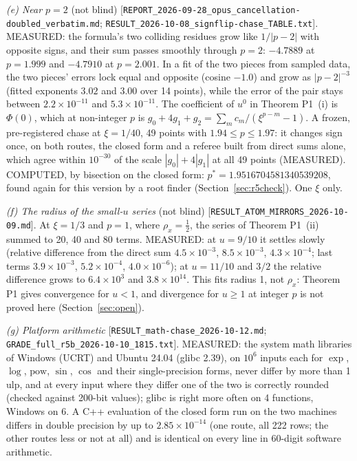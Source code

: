 \documentclass[11pt]{article}
\newcommand{\rec}[1]{\nolinkurl{#1}}
\begin{document}
\medskip
\noindent\emph{(e) Near $p=2$} (not blind) [\rec{REPORT_2026-09-28_opus_cancellation-doubled_verbatim.md}; \rec{RESULT_2026-10-08_signflip-chase_TABLE.txt}]. MEASURED: the formula's two colliding residues grow like $1/|p-2|$ with opposite signs, and their sum passes smoothly through $p=2$: $-4.7889$ at $p=1.999$ and $-4.7910$ at $p=2.001$. In a fit of the two pieces from sampled data, the two pieces' errors lock equal and opposite (cosine $-1.0$) and grow as $|p-2|^{-3}$ (fitted exponents $3.02$ and $3.00$ over 14 points), while the error of the pair stays between $2.2\times10^{-11}$ and $5.3\times10^{-11}$. The coefficient of $u^0$ in Theorem P1~(i) is $\Phi(0)$, which at non-integer $p$ is $g_0+4g_1+g_2=\sum_mc_m/(\xi^{p-m}-1)$. A frozen, pre-registered chase at $\xi=1/40$, 49 points with $1.94\le p\le1.97$: it changes sign once, on both routes, the closed form and a referee built from direct sums alone, which agree within $10^{-30}$ of the scale $|g_0|+4|g_1|$ at all 49 points (MEASURED). COMPUTED, by bisection on the closed form: $p^*=1.9516704581340539208$, found again for this version by a root finder (Section~\ref{sec:r5check}). One $\xi$ only.

\medskip
\noindent\emph{(f) The radius of the small-$u$ series} (not blind) [\rec{RESULT_ATOM_MIRRORS_2026-10-09.md}]. At $\xi=1/3$ and $p=1$, where $\rho_x=\frac12$, the series of Theorem P1~(ii) summed to 20, 40 and 80 terms. MEASURED: at $u=9/10$ it settles slowly (relative difference from the direct sum $4.5\times10^{-3}$, $8.5\times10^{-3}$, $4.3\times10^{-4}$; last terms $3.9\times10^{-3}$, $5.2\times10^{-4}$, $4.0\times10^{-6}$); at $u=11/10$ and $3/2$ the relative difference grows to $6.4\times10^3$ and $3.8\times10^{14}$. This fits radius 1, not $\rho_x$: Theorem P1 gives convergence for $u<1$, and divergence for $u\ge1$ at integer $p$ is not proved here (Section~\ref{sec:open}).

\medskip
\noindent\emph{(g) Platform arithmetic} [\rec{RESULT_math-chase_2026-10-12.md}; \rec{GRADE_full_r5b_2026-10-10_1815.txt}]. MEASURED: the system math libraries of Windows (UCRT) and Ubuntu 24.04 (glibc 2.39), on $10^6$ inputs each for $\exp$, $\log$, $\mathrm{pow}$, $\sin$, $\cos$ and their single-precision forms, never differ by more than 1 ulp, and at every input where they differ one of the two is correctly rounded (checked against 200-bit values); glibc is right more often on 4 functions, Windows on 6. A C++ evaluation of the closed form run on the two machines differs in double precision by up to $2.85\times10^{-14}$ (one route, all 222 rows; the other routes less or not at all) and is identical on every line in 60-digit software arithmetic.
\end{document}
